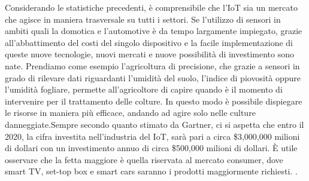Considerando le statistiche precedenti, è comprensibile che l'IoT sia un
mercato che agisce in maniera trasversale su tutti i settori.  Se l'utilizzo di
sensori in ambiti quali la domotica e l'automotive è da tempo largamente
impiegato, grazie all'abbattimento del costi del
singolo  dispositivo e la facile implementazione di queste nuove tecnologie,  nuovi
mercati e nuove possibilità di investimento sono nate. Prendiamo come esempio
l'agricoltura di precisione, che grazie a sensori in grado di rilevare dati
riguardanti l'umidità del suolo, l'indice di piovosità oppure l'umidità fogliare,
permette all'agricoltore di  capire quando è il momento di intervenire per il
trattamento delle colture. In questo modo è possibile dispiegare le risorse in
maniera più efficace, andando ad agire solo nelle culture danneggiate.Sempre
secondo quanto stimato da Gartner, ci si aspetta che entro il 2020, 
la cifra investita nell'industria del IoT,
sarà pari a circa \$3,000,000 milioni di dollari con un investimento annuo di
circa \$500,000 milioni di dollari. È utile osservare che la fetta maggiore è quella
riservata al mercato consumer, dove smart TV, set-top box e smart cars saranno i prodotti
maggiormente richiesti.
\cite{gartner2016}. 



